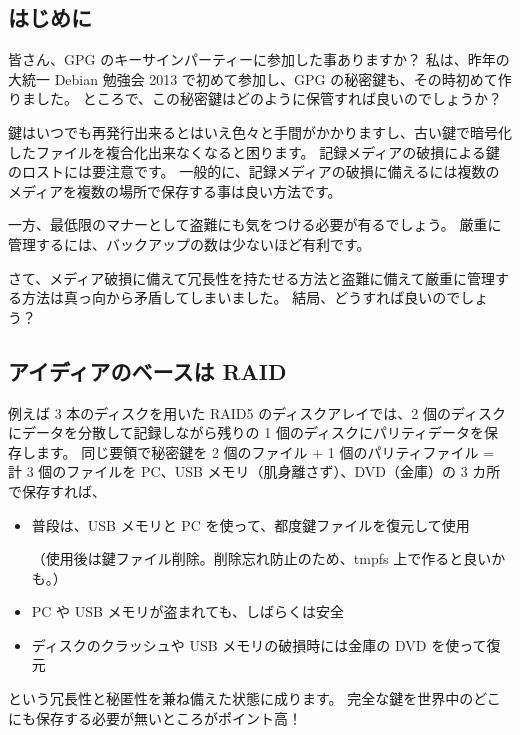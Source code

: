 \documentclass[mingoth,a4paper]{jsarticle}
\begin{document}
\subsection{はじめに}

皆さん、GPG のキーサインパーティーに参加した事ありますか？
私は、昨年の大統一 Debian 勉強会 2013 で初めて参加し、GPG の秘密鍵も、その時初めて作りました。
ところで、この秘密鍵はどのように保管すれば良いのでしょうか？

鍵はいつでも再発行出来るとはいえ色々と手間がかかりますし、古い鍵で暗号化したファイルを複合化出来なくなると困ります。
記録メディアの破損による鍵のロストには要注意です。
一般的に、記録メディアの破損に備えるには複数のメディアを複数の場所で保存する事は良い方法です。

一方、最低限のマナーとして盗難にも気をつける必要が有るでしょう。
厳重に管理するには、バックアップの数は少ないほど有利です。

さて、メディア破損に備えて冗長性を持たせる方法と盗難に備えて厳重に管理する方法は真っ向から矛盾してしまいました。
結局、どうすれば良いのでしょう？

\subsection{アイディアのベースは RAID}

例えば 3 本のディスクを用いた RAID5 のディスクアレイでは、2 個のディスクにデータを分散して記録しながら残りの 1 個のディスクにパリティデータを保存します。
同じ要領で秘密鍵を 2 個のファイル + 1 個のパリティファイル = 計 3 個のファイルを PC、USB メモリ（肌身離さず）、DVD（金庫）の 3 カ所で保存すれば、
\begin{itemize}
\item 普段は、USB メモリと PC を使って、都度鍵ファイルを復元して使用

  （使用後は鍵ファイル削除。削除忘れ防止のため、tmpfs 上で作ると良いかも。）
\item PC や USB メモリが盗まれても、しばらくは安全
\item ディスクのクラッシュや USB メモリの破損時には金庫の DVD を使って復元
\end{itemize}
という冗長性と秘匿性を兼ね備えた状態に成ります。
完全な鍵を世界中のどこにも保存する必要が無いところがポイント高！
\end{document}

